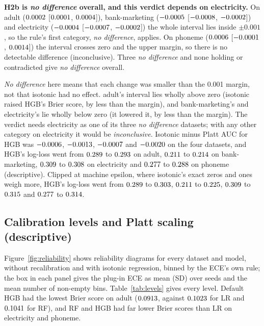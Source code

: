 \documentclass[11pt]{article}
\newcommand{\md}[3]{$#1$ [$#2$, $#3$]}
\newcommand{\ds}[1]{\textsf{#1}}
\newcommand{\ad}{\ds{adult}}
\newcommand{\bm}{\ds{bank-marketing}}
\newcommand{\el}{\ds{electricity}}
\newcommand{\ph}{\ds{phoneme}}
\newcommand{\cat}[1]{\emph{#1}}
\begin{document}
\textbf{H2b is \cat{no difference} overall, and this verdict depends on \el.} On \ad{}
(\md{\HTwoBAdultMean}{\HTwoBAdultLo}{\HTwoBAdultHi}), \bm{}
(\md{\HTwoBBankMean}{\HTwoBBankLo}{\HTwoBBankHi}) and \el{}
(\md{\HTwoBElecMean}{\HTwoBElecLo}{\HTwoBElecHi}) the whole interval lies inside $\pm0.001$,
so the rule's first category, \cat{no difference}, applies. On \ph{}
(\md{\HTwoBPhonemeMean}{\HTwoBPhonemeLo}{\HTwoBPhonemeHi}) the interval crosses zero and the
upper margin, so there is no detectable difference (inconclusive). Three \cat{no difference}
and none holding or contradicted give \cat{no difference} overall.

\cat{No difference} here means that each change was smaller than the 0.001 margin, not that
isotonic had no effect. \ad's interval lies wholly above zero (isotonic raised HGB's Brier
score, by less than the margin), and \bm's and \el's lie wholly below zero (it lowered it, by
less than the margin). The verdict needs \el{} as one of its three \cat{no difference}
datasets; with any other category on \el{} it would be \cat{inconclusive}. Isotonic minus
Platt AUC for HGB was $-0.0006$, $-0.0013$,
$-0.0007$ and $-0.0020$ on the four datasets, and HGB's
log-loss went from $0.289$ to $0.293$ on \ad,
$0.211$ to $0.214$ on \bm, $0.309$ to
$0.308$ on \el{} and $0.277$ to $0.288$ on \ph{}
(descriptive). Clipped at machine epsilon, where isotonic's exact zeros and ones weigh more,
HGB's log-loss went from $0.289$ to $0.303$,
$0.211$ to $0.225$, $0.309$ to
$0.315$ and $0.277$ to $0.314$.

\subsection{Calibration levels and Platt scaling (descriptive)}
\label{sec:levels}

Figure~\ref{fig:reliability} shows reliability diagrams for every dataset and model, without
recalibration and with isotonic regression, binned by the ECE's own rule; the box in each
panel gives the plug-in ECE as mean (SD) over seeds and the mean number of non-empty bins.
Table~\ref{tab:levels} gives every level. Default HGB had the lowest Brier score on \ad{}
($0.0913$, against $0.1023$ for LR and $0.1041$ for RF), and
RF and HGB had far lower Brier scores than LR on \el{} and \ph.
\end{document}
